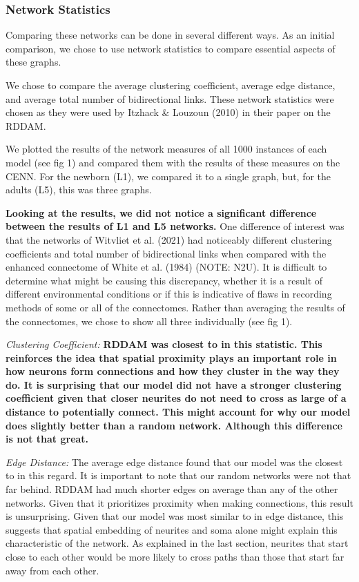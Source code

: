 \subsubsection{Network Statistics}
Comparing these networks can be done in several different ways. As an initial comparison, we chose to use network statistics to compare essential aspects of these graphs. 

We chose to compare the average clustering coefficient, average edge distance, and average total number of bidirectional links. These network statistics were chosen as they were used by Itzhack \& Louzoun (2010) in their paper on the RDDAM. 

We plotted the results of the network measures of all 1000 instances of each model (see fig 1) and compared them with the results of these measures on the CENN. For the newborn (L1), we compared it to a single graph, but, for the adults (L5), this was three graphs.


\textbf{Looking at the results, we did not notice a significant difference between the results of L1 and L5 networks.} One difference of interest was that the networks of Witvliet et al. (2021) had noticeably different clustering coefficients and total number of bidirectional links when compared with the enhanced connectome of White et al. (1984) (NOTE: N2U). It is difficult to determine what might be causing this discrepancy, whether it is a result of different environmental conditions or if this is indicative of flaws in recording methods of some or all of the connectomes. Rather than averaging the results of the connectomes, we chose to show all three individually (see fig 1). 

\textit{Clustering Coefficient:} \textbf{RDDAM was closest to \ce in this statistic. This reinforces the idea that spatial proximity plays an important role in how neurons form connections and how they cluster in the way they do. It is surprising that our model did not have a stronger clustering coefficient given that closer neurites do not need to cross as large of a distance to potentially connect. This might account for why our model does slightly better than a random network. Although this difference is not that great.}

\textit{Edge Distance:} The average edge distance found that our model was the closest to \ce in this regard. It is important to note that our random networks were not that far behind. RDDAM had much shorter edges on average than any of the other networks. Given that it prioritizes proximity when making connections, this result is unsurprising. Given that our model was most similar to \ce in edge distance, this suggests that spatial embedding of neurites and soma alone might explain this characteristic of the network. As explained in the last section, neurites that start close to each other would be more likely to cross paths than those that start far away from each other.

